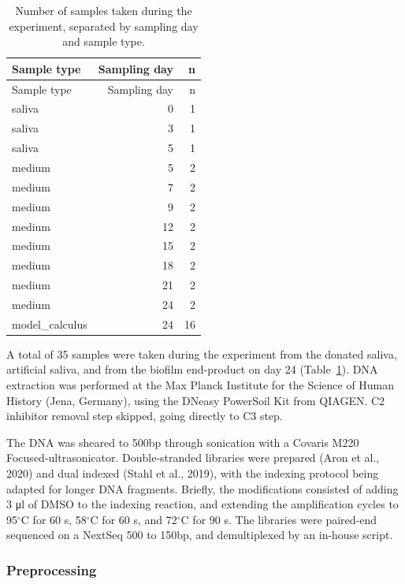 \documentclass[
]{article}
\begin{document}
\hypertarget{tbl-dna-samples}{}
\begin{longtable}[]{@{}lrr@{}}
\caption{\label{tbl-dna-samples}Number of samples taken during the
experiment, separated by sampling day and sample type.}\tabularnewline
\toprule\noalign{}
Sample type & Sampling day & n \\
\midrule\noalign{}
\endfirsthead
\toprule\noalign{}
Sample type & Sampling day & n \\
\midrule\noalign{}
\endhead
\bottomrule\noalign{}
\endlastfoot
saliva & 0 & 1 \\
saliva & 3 & 1 \\
saliva & 5 & 1 \\
medium & 5 & 2 \\
medium & 7 & 2 \\
medium & 9 & 2 \\
medium & 12 & 2 \\
medium & 15 & 2 \\
medium & 18 & 2 \\
medium & 21 & 2 \\
medium & 24 & 2 \\
model\_calculus & 24 & 16 \\
\end{longtable}

A total of 35 samples were taken during the experiment from the donated
saliva, artificial saliva, and from the biofilm end-product on day 24
(Table~\ref{tbl-dna-samples}). DNA extraction was performed at the Max
Planck Institute for the Science of Human History (Jena, Germany), using
the DNeasy PowerSoil Kit from QIAGEN. C2 inhibitor removal step skipped,
going directly to C3 step.

The DNA was sheared to 500bp through sonication with a Covaris M220
Focused-ultrasonicator. Double-stranded libraries were prepared (Aron et
al., 2020) and dual indexed (Stahl et al., 2019), with the indexing
protocol being adapted for longer DNA fragments. Briefly, the
modifications consisted of adding 3 μl of DMSO to the indexing reaction,
and extending the amplification cycles to 95\(^{\circ}\)C for 60 s,
58\(^{\circ}\)C for 60 s, and 72\(^{\circ}\)C for 90 s. The libraries
were paired-end sequenced on a NextSeq 500 to 150bp, and demultiplexed
by an in-house script.

\hypertarget{preprocessing}{%
\subsubsection{Preprocessing}\label{preprocessing}}
\end{document}
